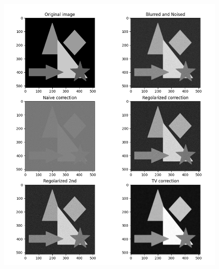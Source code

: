 \documentclass[12pt]{article}
\begin{document}
    \begin{figure}[h!]
    \centering
    \includegraphics[width=14cm]{sample8}
    \end{figure}
    \newpage
\end{document}
